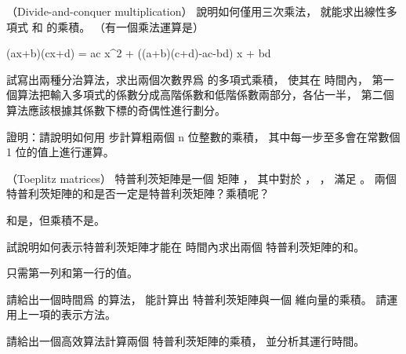 \startsubject[
  title={Problems},
]

\startPROBLEM
（Divide-and-conquer multiplication）
\startigBase[a]\startitem
說明如何僅用三次乘法，
就能求出線性多項式  和  的乘積。
（\hint 有一個乘法運算是）
\stopitem\stopigBase

\startANSWER
\startformula
(ax+b)(cx+d) = ac x^2 + ((a+b)(c+d)-ac-bd) x + bd
\stopformula
\stopANSWER

\startigBase[continue]\startitem
試寫出兩種分治算法，求出兩個次數界爲  的多項式乘積，
使其在  時間內，
第一個算法把輸入多項式的係數分成高階係數和低階係數兩部分，各佔一半，
第二個算法應該根據其係數下標的奇偶性進行劃分。
\stopitem\stopigBase

\startANSWER
{}
\stopANSWER

\startigBase[continue]\startitem
證明：請說明如何用  步計算粗兩個 n 位整數的乘積，
其中每一步至多會在常數個 1 位的值上進行運算。
\stopitem\stopigBase

\startANSWER
{}
\stopANSWER

\stopPROBLEM

\startPROBLEM
（Toeplitz matrices）
{\EMP 特普利茨矩陣}是一個  矩陣 ，
其中對於 ， ，
滿足 。
\startigBase[a]\startitem
兩個特普利茨矩陣的和是否一定是特普利茨矩陣？乘積呢？
\stopitem\stopigBase

\startANSWER
和是，但乘積不是。
\stopANSWER

\startigBase[continue]\startitem
試說明如何表示特普利茨矩陣才能在  時間內求出兩個  特普利茨矩陣的和。
\stopitem\stopigBase

\startANSWER
只需第一列和第一行的值。
\stopANSWER

\startigBase[continue]\startitem
請給出一個時間爲  的算法，
能計算出  特普利茨矩陣與一個  維向量的乘積。
請運用上一項的表示方法。
\stopitem\stopigBase

\startANSWER
{}
\stopANSWER

\startigBase[continue]\startitem
請給出一個高效算法計算兩個  特普利茨矩陣的乘積，
並分析其運行時間。
\stopitem\stopigBase

\startANSWER
{}
\stopANSWER

\stopPROBLEM

